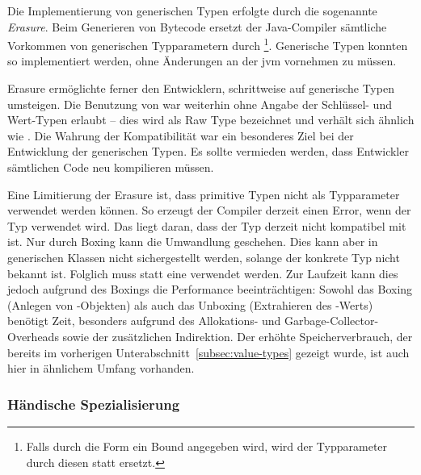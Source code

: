 Die Implementierung von generischen Typen erfolgte durch die sogenannte \emph{Erasure}.
Beim Generieren von Bytecode ersetzt der Java-Compiler sämtliche Vorkommen von generischen Typparametern durch \footnote{Falls durch die Form  ein Bound angegeben wird, wird der Typparameter durch diesen statt  ersetzt.}.
Generische Typen konnten so implementiert werden, ohne Änderungen an der \ac{jvm} vornehmen zu müssen.

Erasure ermöglichte ferner den Entwicklern, schrittweise auf generische Typen umsteigen.
Die Benutzung von  war weiterhin ohne Angabe der Schlüssel- und Wert-Typen erlaubt -- dies wird als Raw Type bezeichnet und verhält sich ähnlich wie .
Die Wahrung der Kompatibilität war ein besonderes Ziel bei der Entwicklung der generischen Typen.
Es sollte vermieden werden, dass Entwickler sämtlichen Code neu kompilieren müssen.

Eine Limitierung der Erasure ist, dass primitive Typen nicht als Typparameter verwendet werden können.
So erzeugt der Compiler derzeit einen Error, wenn der Typ  verwendet wird.
Das liegt daran, dass der Typ  derzeit nicht kompatibel mit  ist.
Nur durch Boxing kann die Umwandlung  geschehen.
Dies kann aber in generischen Klassen nicht sichergestellt werden, solange der konkrete Typ nicht bekannt ist.
Folglich muss statt  eine  verwendet werden.
Zur Laufzeit kann dies jedoch aufgrund des Boxings die Performance beeinträchtigen:
Sowohl das Boxing (Anlegen von -Objekten) als auch das Unboxing (Extrahieren des -Werts) benötigt Zeit, besonders aufgrund des Allokations- und Garbage-Collector-Overheads sowie der zusätzlichen Indirektion.
Der erhöhte Speicherverbrauch, der bereits im vorherigen Unterabschnitt~\ref{subsec:value-types} gezeigt wurde, ist auch hier in ähnlichem Umfang vorhanden.

\subsubsection{Händische Spezialisierung}

